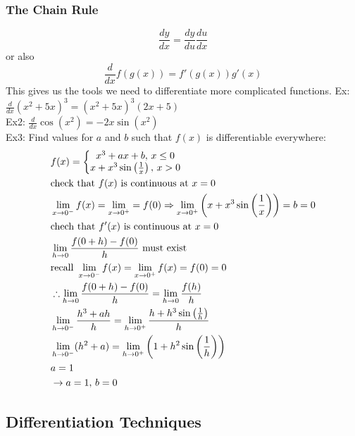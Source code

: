 \documentclass[11pt, fleqn]{article}
\begin{document}
\subsubsection{The Chain Rule}
$$\frac{dy}{dx}=\frac{dy}{du}\frac{du}{dx}$$ or also $$\frac{d}{dx}f(g(x))=f'(g(x))g'(x)$$
This gives us the tools we need to differentiate more complicated functions.
Ex: $\frac{d}{dx}(x^2+5x)^3=(x^2+5x)^3(2x+5)$\\
Ex2: $\frac{d}{dx}\cos(x^2)=-2x\sin(x^2)$\\
Ex3: Find values for $a$ and $b$ such that $f(x)$ is differentiable everywhere:
\begin{align*}
    &f(x)=\left\{\begin{matrix}
    x^3+ax+b,\,x\leq 0\\
    x+x^3\sin\left( \frac{1}{x} \right)
    ,\,x>0\end{matrix}\right.\\
    &\text{check that $f(x)$ is continuous at $x=0$}\\
    &\lim_{x\to0^-}f(x)=\lim_{x\to0^+}=f(0)\Rightarrow\lim_{x\to 0^+}\left( x+x^3\sin\left( \frac{1}{x} \right) \right)=b=0\\
    &\text{chech that $f'(x)$ is continuous at $x=0$}\\
    &\lim_{h\to 0}\frac{f(0+h)-f(0)}{h}\text{ must exist}\\
    &\text{recall }\lim_{x\to 0^-}f(x)=\lim_{x\to0^+}f(x)=f(0)=0\\
    &\therefore \lim_{h\to 0}\frac{f(0+h)-f(0)}{h}=\lim_{h\to0}\frac{f(h)}{h}\\
    &\lim_{h\to 0^-}\frac{h^3+ah}{h}=\lim_{h\to 0^+}\frac{h+h^3\sin\left( \frac{1}{h} \right)}{h}\\
    &\lim_{h\to0^-}(h^2+a)=\lim_{h\to0^+}\left( 1+h^2\sin\left( \frac{1}{h} \right) \right)\\
    &a=1\\
    &\to a=1,\,b=0
\end{align*}










\subsection{Differentiation Techniques}
\end{document}
